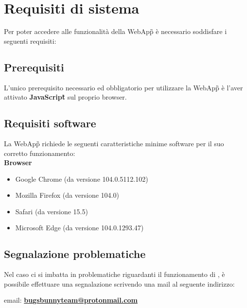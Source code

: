 \section{Requisiti di sistema}
Per poter accedere alle funzionalità della WebApp\G{} è necessario soddisfare i seguenti requisiti:

\subsection{Prerequisiti}
L'unico prerequisito necessario ed obbligatorio per utilizzare la WebApp\G{} \platform{} è l'aver attivato \textbf{JavaScript}\G{} sul proprio browser.

\subsection{Requisiti software}
La WebApp\G{} \platform{} richiede le seguenti caratteristiche minime software per il suo corretto funzionamento:\\


\textbf{Browser}
\begin{itemize}
    \item Google Chrome (da versione 104.0.5112.102)
    \item Mozilla Firefox (da versione 104.0)
    \item Safari (da versione 15.5)
    \item Microsoft Edge (da versione 104.0.1293.47)
\end{itemize}

\subsection{Segnalazione problematiche}
Nel caso ci si imbatta in problematiche riguardanti il funzionamento di \platform, è possibile
effettuare una segnalazione scrivendo una mail al seguente indirizzo:\\


\begin{center}
email: \textbf{\href{mailto:bugsbunnyteam@protonmail.com}{bugsbunnyteam@protonmail.com} }
\end{center}
